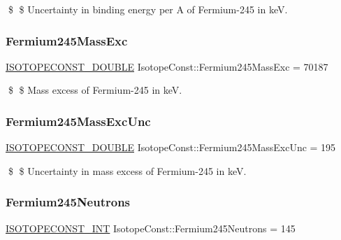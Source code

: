 \$ \$ Uncertainty in binding energy per A of Fermium-\/245 in keV. \mbox{\label{group___isotope_const-_fermium-_fm245_ga5a3e9ce06e07683acb499fc5d63a602f}} 
\subsubsection{\texorpdfstring{Fermium245\+Mass\+Exc}{Fermium245MassExc}}
{\footnotesize\ttfamily \mbox{\hyperlink{group___isotope_const-_macros_ga8f45a7272ce02c0b4c65c44636ed719a}{I\+S\+O\+T\+O\+P\+E\+C\+O\+N\+S\+T\+\_\+\+D\+O\+U\+B\+LE}} Isotope\+Const\+::\+Fermium245\+Mass\+Exc = 70187}

\$ \$ Mass excess of Fermium-\/245 in keV. \mbox{\label{group___isotope_const-_fermium-_fm245_gaec46110ea3e8e2489aa0bcffb1ba1eed}} 
\subsubsection{\texorpdfstring{Fermium245\+Mass\+Exc\+Unc}{Fermium245MassExcUnc}}
{\footnotesize\ttfamily \mbox{\hyperlink{group___isotope_const-_macros_ga8f45a7272ce02c0b4c65c44636ed719a}{I\+S\+O\+T\+O\+P\+E\+C\+O\+N\+S\+T\+\_\+\+D\+O\+U\+B\+LE}} Isotope\+Const\+::\+Fermium245\+Mass\+Exc\+Unc = 195}

\$ \$ Uncertainty in mass excess of Fermium-\/245 in keV. \mbox{\label{group___isotope_const-_fermium-_fm245_gab9fe78c1385f38ccf9b96f01907722ad}} 
\subsubsection{\texorpdfstring{Fermium245\+Neutrons}{Fermium245Neutrons}}
{\footnotesize\ttfamily \mbox{\hyperlink{group___isotope_const-_macros_ga5f18360b3e99483a35c32d789e62621c}{I\+S\+O\+T\+O\+P\+E\+C\+O\+N\+S\+T\+\_\+\+I\+NT}} Isotope\+Const\+::\+Fermium245\+Neutrons = 145}

